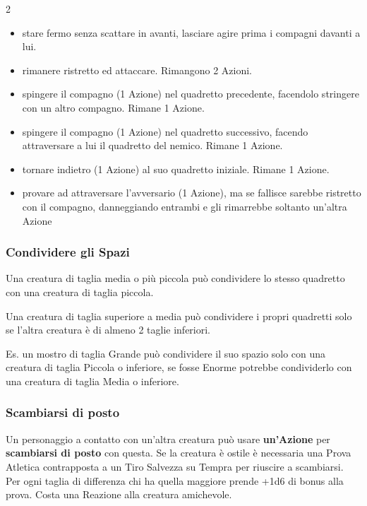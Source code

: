 \begin{multicols}{2}
\begin{giocatore}
\begin{itemize}[leftmargin=*] \setlength{\itemsep}{-1pt}
	\item stare fermo senza scattare in avanti, lasciare agire prima i compagni davanti a lui.
	\item rimanere ristretto ed attaccare. Rimangono 2 Azioni.
	\item spingere il compagno (1 Azione) nel quadretto precedente, facendolo stringere con un altro compagno. Rimane 1 Azione.
	\item spingere il compagno (1 Azione) nel quadretto successivo, facendo attraversare a lui il quadretto del nemico. Rimane 1 Azione.
	\item tornare indietro (1 Azione) al suo quadretto iniziale. Rimane 1 Azione.
	\item provare ad attraversare l'avversario (1 Azione), ma se fallisce sarebbe ristretto con il compagno, danneggiando entrambi e gli rimarrebbe soltanto un'altra Azione
\end{itemize}

\end{giocatore}

\subsubsection{Condividere gli Spazi}\label{condividereglispazi}\hypertarget{condividereglispazi}{}

Una creatura di taglia media o più piccola può condividere lo stesso quadretto con una creatura di taglia piccola.

Una creatura di taglia superiore a media può condividere i propri quadretti solo se l'altra creatura è di almeno 2 taglie inferiori.

Es. un mostro di taglia Grande può condividere il suo spazio solo con una creatura di taglia Piccola o inferiore, se fosse Enorme potrebbe condividerlo con una creatura di taglia Media o inferiore.

\subsubsection{Scambiarsi di posto}
Un personaggio a contatto con un'altra creatura può usare \textbf{un'Azione} per \textbf{scambiarsi di posto} con questa. Se la creatura è ostile è necessaria una Prova Atletica contrapposta a un Tiro Salvezza su Tempra per riuscire a scambiarsi. Per ogni taglia di differenza chi ha quella maggiore prende +1d6 di bonus alla prova. Costa una Reazione alla creatura amichevole.


\end{multicols}
